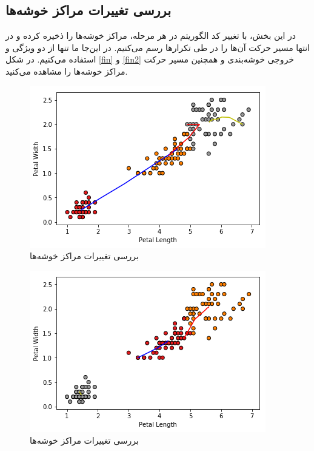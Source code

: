 \documentclass[a4paper]{article}
\begin{document}
\begin{large}
\section{بررسی تغییرات مراکز خوشه‌ها}
در این بخش، با تغییر کد الگوریتم 
در هر مرحله، مراکز خوشه‌ها را ذخیره کرده و در انتها مسیر حرکت آن‌ها را در طی تکرار‌ها رسم می‌کنیم. در این‌جا ما تنها از دو ویژگی 
و 
استفاده می‌کنیم. در شکل 
\eqref{fin}
و 
\eqref{fin2}
خروجی خوشه‌بندی و همچنین مسیر حرکت مراکز خوشه‌ها را مشاهده می‌کنید.
\begin{figure}[h!]
	\centering
	\includegraphics[scale=0.6]{fin.png}
	\caption{بررسی تغییرات مراکز خوشه‌ها}
	\label{fin}
\end{figure}
\begin{figure}[h!]
	\centering
	\includegraphics[scale=0.6]{fin2.png}
	\caption{بررسی تغییرات مراکز خوشه‌ها}
	\label{fin2}
\end{figure}


\end{large}
\end{document}
